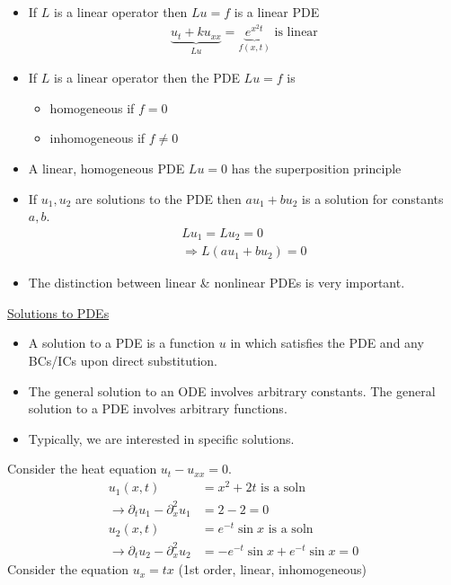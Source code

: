 \documentclass[12pt, letterpaper]{article}
\begin{document}
\begin{itemize}
    \item If $L$ is a linear operator then $Lu = f$ is a linear PDE
    \begin{align*}
        \underbrace{u_t + ku_{xx}}_{Lu} = \underbrace{e^{x^2t}}_{f(x,t)} \text{ is linear}
    \end{align*}
    \item If $L$ is a linear operator then the PDE $Lu = f$ is 
    \begin{itemize}
        \item homogeneous if $f = 0$
        \item inhomogeneous if $f \ne 0$ 
    \end{itemize}
    \item A linear, homogeneous PDE $Lu = 0$ has the superposition principle
    \item If $u_1, u_2$ are solutions to the PDE then $au_1 + bu_2$ is a solution for 
    constants $a,b$.
    \begin{align*}
        Lu_1 = Lu_2 = 0 \\
        \Rightarrow L(au_1 + bu_2) = 0
    \end{align*}
    \item The distinction between linear \& nonlinear PDEs is very important.
\end{itemize}
\underline{Solutions to PDEs}
\begin{itemize}
    \item A solution to a PDE is a function $u$ in which satisfies the PDE and any BCs/ICs upon
    direct substitution.
    \item The general solution to an ODE involves arbitrary constants. The general solution to 
    a PDE involves arbitrary functions.
    \item Typically, we are interested in specific solutions.
\end{itemize}
 Consider the heat equation   $u_t - u_{xx} = 0$.
\begin{align*}
    u_1(x,t) &= x^2 + 2t \text{ is a soln} \\
    \rightarrow \partial_t u_1 - \partial_x^2 u_1 &= 2-2 = 0 \\
    u_2(x,t) &= e^{-t} \sin x \text{ is a soln} \\
    \rightarrow \partial_t u_2 - \partial^2_xu_2 &= -e^{-t}\sin x + e^{-t} \sin x = 0
\end{align*}
 Consider the equation $u_x = tx$ (1st order, linear, inhomogeneous)
\end{document}
